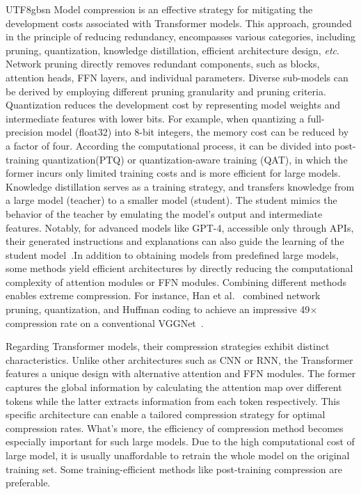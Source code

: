 \documentclass[10pt,journal,compsoc]{IEEEtran}
\newcommand{\etc}{\emph{etc}}
\newcommand{\<}{\left\langle}
\renewcommand{\>}{\right\rangle}
\newcommand{\1}{\mathbbm{1}}
\begin{document}
\begin{CJK}{UTF8}{gbsn}
Model compression is  an effective strategy for mitigating the development costs associated with Transformer models. This approach, grounded in the principle of  reducing redundancy, encompasses various categories, including pruning, quantization, knowledge distillation, efficient architecture design, \etc. Network pruning directly removes redundant components, such as blocks, attention heads, FFN layers, and  individual parameters. Diverse sub-models can be derived by employing different pruning granularity and pruning criteria. Quantization reduces the development cost by representing model weights and intermediate features with lower bits. For example, when quantizing a full-precision model (float32) into 8-bit integers, the memory cost can be reduced by a factor of four. According the computational process, it can be divided into post-training quantization(PTQ) or quantization-aware training (QAT), in which the former  incurs only limited training costs and is more efficient for large models.
Knowledge distillation serves as a training strategy, and transfers knowledge from a large model (teacher) to a smaller model (student). The student mimics the behavior of the teacher by emulating the model's output and intermediate features. Notably, for advanced models like GPT-4, accessible only through APIs, their generated instructions and explanations can also guide the learning of the student model~\cite{jiang2023lion,li2022explanations}.In addition to obtaining models from predefined large models, some methods yield efficient architectures by directly reducing the computational complexity of attention modules or FFN modules. Combining different methods enables extreme compression. For instance, Han et al.~\cite{han2015deep} combined network pruning, quantization, and Huffman coding to achieve an impressive 49$\times$ compression rate on a conventional VGGNet~\cite{simonyan2014very}.

Regarding Transformer models, their compression strategies exhibit distinct characteristics. Unlike other architectures such as CNN or RNN, the Transformer features a unique design with alternative attention and FFN modules. The former captures the global information by calculating the attention map over different tokens while the latter extracts information from each token respectively. This specific architecture can enable a tailored compression strategy for optimal compression rates. What's more, the efficiency of compression method becomes especially important for such large models. Due to the high computational cost of large model, it is usually unaffordable to retrain the whole model on the original training set. Some training-efficient methods like post-training compression are preferable.  


\end{CJK}
\end{document}
